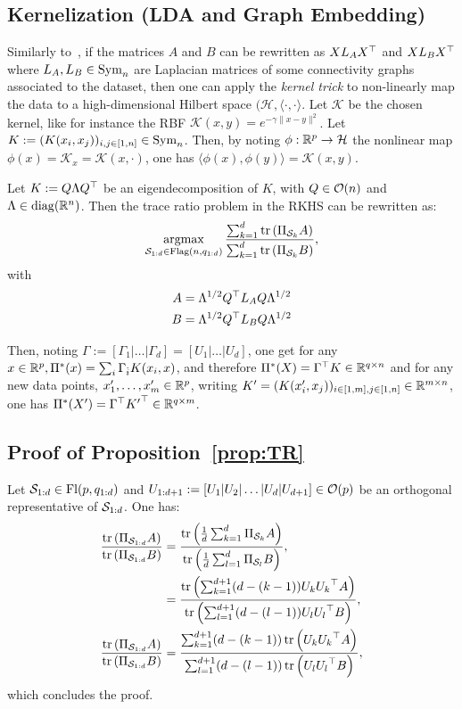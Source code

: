 \subsection{Kernelization (LDA and Graph Embedding)}
Similarly to~\citet{yan_graph_2007,wang_trace_2007}, if the matrices $A$ and $B$ can be rewritten as $X L_A X^\top$ and $X L_B X^\top$ where $L_A, L_B \in \operatorname{Sym}_n$ are Laplacian matrices of some connectivity graphs associated to the dataset, then one can apply the \textit{kernel trick} to non-linearly map the data to a high-dimensional Hilbert space $(\mathcal{H}, \langle \cdot, \cdot\rangle$. Let $\mathcal{K}$ be the chosen kernel, like for instance the RBF $\mathcal{K}(x, y) = e^{- \gamma \|x - y\|^2}$. Let ${K} := (K(x_i, x_j))_{i, j \in [1, n]} \in \operatorname{Sym}_n$. Then, by noting $\phi: \mathbb{R}^p \to \mathcal{H}$ the nonlinear map $\phi(x) = \mathcal{K}_x = \mathcal{K}(x, \cdot)$, one has $\langle \phi(x), \phi(y)\rangle = \mathcal{K}(x, y)$. 

Let $K := Q \Lambda Q^\top$ be an eigendecomposition of $K$, with $Q\in \mathcal{O}(n)$ and $\Lambda\in\operatorname{diag}(\mathbb{R}^n)$.
Then the trace ratio problem in the RKHS can be rewritten as:
\begin{equation}
\underset{{\mathcal{S}_{1:d}} \in \operatorname{Flag}(n, q_{1:d})}{\operatorname{argmax}} \, \frac{\sum_{k=1}^d \operatorname{tr}\left(\Pi_{\mathcal{S}_k} A\right)}{\sum_{k=1}^d \operatorname{tr}\left(\Pi_{\mathcal{S}_k} B\right)},
\end{equation}
with 
\begin{align*}
A &= \Lambda^{1/2} Q^\top L_A Q \Lambda^{1/2}\\
B &= \Lambda^{1/2} Q^\top L_B Q \Lambda^{1/2}
\end{align*}

Then, noting $\Gamma := [\Gamma_1|\dots|\Gamma_d] = [U_1|\dots|U_d]$, one get for any $x\in \mathbb{R}^p, \Pi^*(x) = \sum_i \Gamma_{\dot i} K(x_i, x)$, and therefore $\Pi^*(X) = \Gamma^\top K \in \mathbb{R}^{q \times n}$ and for any new data points, $x'_1, \dots, x'_m \in \mathbb{R}^p$, writing ${K}' = (K(x'_i, x_j))_{i \in [1, m], j \in [1, n]} \in \mathbb{R}^{m\times n}$, one has ${\Pi^*}(X') = \Gamma^\top {K'}^\top \in \mathbb{R}^{q \times m}$.



\subsection{Proof of Proposition~\ref{prop:TR}}
Let $\mathcal{S}_{1:d} \in \operatorname{Fl}(p, q_{1:d})$ and $U_{1:d+1} := [U_1|U_2|\dots|U_d|U_{d+1}] \in \mathcal{O}(p)$ be an orthogonal representative of $\mathcal{S}_{1:d}$. One has:
\begin{align}
	\frac{\operatorname{tr}\left(\Pi_{\mathcal{S}_{1:d}} A\right)}{\operatorname{tr}\left(\Pi_{\mathcal{S}_{1:d}} B\right)} &= \frac{\operatorname{tr}\left(\frac1d \sum_{k=1}^d \Pi_{\mathcal{S}_k} A\right)}{\operatorname{tr}\left(\frac1d \sum_{l=1}^d \Pi_{\mathcal{S}_l} B\right)},\\
	&= \frac{\operatorname{tr}\left(\sum_{k=1}^{d+1} (d - (k-1)) U_k {U_k}^\top A\right)}{\operatorname{tr}\left(\sum_{l=1}^{d+1} (d - (l-1)) U_l {U_l}^\top B\right)},\\
	\frac{\operatorname{tr}\left(\Pi_{\mathcal{S}_{1:d}} A\right)}{\operatorname{tr}\left(\Pi_{\mathcal{S}_{1:d}} B\right)} &= \frac{\sum_{k=1}^{d+1} (d - (k-1)) \operatorname{tr}\left(U_k {U_k}^\top A\right)}{\sum_{l=1}^{d+1} (d - (l-1)) \operatorname{tr}\left(U_l {U_l}^\top B\right)},
\end{align}
which concludes the proof.